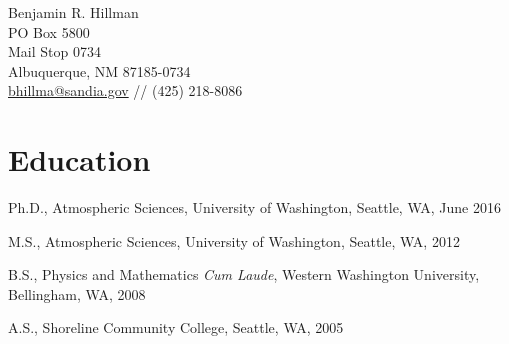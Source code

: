\documentclass[10pt]{article}
\newenvironment{itemize*}{
   \begin{list}{}
      { 
         \setlength{\itemsep}{5pt}
         \setlength{\parsep}{0pt}
         \setlength{\topsep}{0pt}
         \setlength{\leftmargin}{0em} 
      } 
} {
   \end{list}
}
\begin{document}
{\Large Benjamin R. Hillman} \\
PO Box 5800 \\
Mail Stop 0734 \\
Albuquerque, NM 87185-0734 \\
\url{bhillma@sandia.gov} // (425) 218-8086

\section*{Education}
\begin{itemize*}
    \item Ph.D., Atmospheric Sciences,
    University of Washington, Seattle, WA,
    June 2016
    \item M.S., Atmospheric Sciences,
    University of Washington, Seattle, WA,
    2012
    \item B.S., Physics and Mathematics \textit{Cum Laude},
    Western Washington University, Bellingham, WA,
    2008
    \item A.S.,
    Shoreline Community College, Seattle, WA,
    2005
\end{itemize*}
\end{document}
